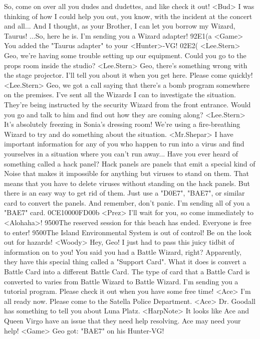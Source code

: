 So, come on over all you dudes and dudettes, and like check it out! 
<Bud> I was thinking of how I could help you out, 
you know, with the incident at the concert and all... 
And I thought, as your Brother, I can let you borrow my Wizard, Taurus! 
...So, here he is. I'm sending you a Wizard adapter! 
{92}{E1}(a 
<Game> You added the "Taurus adapter" to your <Hunter>-VG! 
{02}{E2}(
<Lee.Stern> Geo, we're having some trouble setting up our equipment. 
Could you go to the props room inside the studio? 
<Lee.Stern> Geo, there's something wrong with the stage projector. I'll tell you about 
it when you get here. Please come quickly! 
<Lee.Stern> Geo, we got a call saying that there's a bomb 
program somewhere on the premises. 
I've sent all the Wizards I can to investigate the situation. 
They're being instructed by the security Wizard from the front entrance. 
Would you go and talk to him and find out how they are coming along? 
<Lee.Stern> It's absolutely freezing in Sonia's dressing room! 
We're using a fire-breathing Wizard to try and do 
something about the situation. 
<Mr.Shepar> I have important information for any of you who happen to run into a virus and 
find yourselves in a situation where you can't run away... 
Have you ever heard of something called a hack panel? 
Hack panels are panels that emit a special kind of Noise that makes it 
impossible for anything but viruses to stand on them. 
That means that you have to delete viruses without standing on the 
hack panels. But there is an easy way to get rid of them. 
Just use a "{D0}{E7}", "{BA}{E7}", or similar card to convert the panels. 
And remember, don't panic. I'm sending all of you a "{BA}{E7}" card. 
{0C}{E1}{00}{00}{FD}{00}b
<Prez> I'll wait for you, so come immediately to <Alohaha>! 
{95}{00}The reserved session for this beach has ended. Everyone is free to enter! 
{95}{00}The Island Environmental System is out of control! Be on the look out for hazards! 
<Woody> Hey, Geo! 
I just had to pass this juicy tidbit of information on to you! 
You said you had a Battle Wizard, right? Apparently, 
they have this special thing called a "Support Card". 
What it does is convert a Battle Card into a different Battle Card. 
The type of card that a Battle Card is converted to varies from Battle Wizard to 
Battle Wizard. I'm sending you a tutorial program. 
Please check it out when you have some free time! 
<Ace> I'm all ready now. Please come to the Satella Police Department. 
<Ace> Dr. Goodall has something to tell you about Luna Platz. 
<HarpNote> It looks like Ace and Queen Virgo have an issue that they need help 
resolving. Ace may need your help! 
<Game> Geo got: "{BA}{E7}" on his Hunter-VG! 

